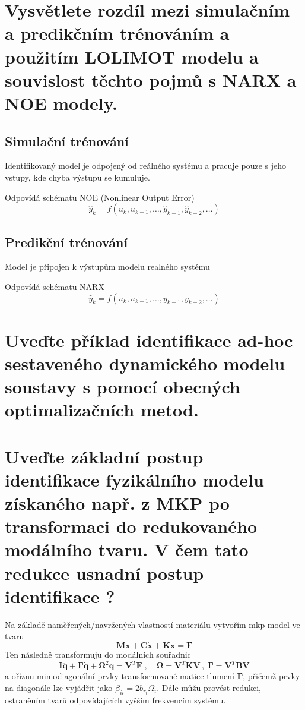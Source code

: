 \documentclass{article}
\begin{document}
	\section{Vysvětlete rozdíl mezi simulačním a predikčním trénováním a použitím LOLIMOT modelu a souvislost těchto pojmů s NARX a NOE modely. }

	\subsection*{Simulační trénování}
	Identifikovaný model je odpojený od reálného systému a pracuje pouze s jeho vstupy, kde chyba výstupu se kumuluje.

	Odpovídá schématu NOE (Nonlinear Output Error)
	\begin{equation}
		\hat{y}_k = f(u_k,u_{k-1},\dots,\hat{y}_{k-1},\hat{y}_{k-2},\dots)
	\end{equation}

	\subsection*{Predikční trénování}
	Model je připojen k výstupům modelu realného systému

	Odpovídá schématu NARX
	\begin{equation}
		\hat{y}_k = f(u_k,u_{k-1},\dots,y_{k-1},y_{k-2},\dots)
	\end{equation}

	\section{Uveďte příklad identifikace ad-hoc sestaveného dynamického modelu soustavy s pomocí obecných optimalizačních metod. }

	\section{Uveďte základní postup identifikace fyzikálního modelu získaného např. z MKP po transformaci do redukovaného modálního tvaru. V čem tato redukce usnadní postup identifikace ? }
	
	Na základě naměřených/navržených vlastností materiálu vytvořím mkp model ve tvaru
	\begin{equation*}
		\bm{M}\bm{\ddot{x}} + \bm{C}\bm{\dot{x}} + \bm{K}\bm{x} = \bm{F}
	\end{equation*}
	Ten následně transformuju do modálních souřadnic
	\begin{equation*}
		\bm{I}\bm{\ddot{q}} + \bm{\Gamma}\bm{\dot{q}} + \bm{\Omega}^2 \bm{q} = \bm{V}^T \bm{F}
		\;,\quad 
		\bm{\Omega} = \bm{V}^T\bm{K}\bm{V}
		\,,\;
		\bm{\Gamma} = \bm{V}^T\bm{B}\bm{V}
	\end{equation*}
	a oříznu mimodiagonální prvky transformované matice tlumení $\bm{\Gamma}$, přičemž prvky na diagonále lze vyjádřit jako $\beta_{ii} = 2 b_{r_i} \Omega_i$. Dále můžu provést redukci, ostraněním tvarů odpovídajících vyšším frekvencím systému.
\end{document}
